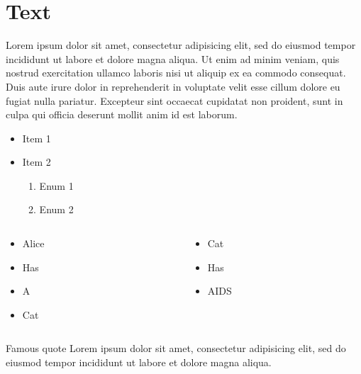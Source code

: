 {
\tableofcontents
}


\section{Text}


{
\begin{multicols}{2}
Lorem ipsum dolor sit amet, consectetur adipisicing elit, sed do eiusmod tempor incididunt ut labore et dolore magna aliqua. Ut enim ad minim veniam, quis nostrud exercitation ullamco laboris nisi ut aliquip ex ea commodo consequat. Duis aute irure dolor in reprehenderit in voluptate velit esse cillum dolore eu fugiat nulla pariatur. Excepteur sint occaecat cupidatat non proident, sunt in culpa qui officia deserunt mollit anim id est laborum.
\end{multicols}
}


{
\begin{itemize}
\item Item 1
\pause

\item Item 2
\begin{enumerate}
\item Enum 1
\item Enum 2
\end{enumerate}
\end{itemize}
}


{
\begin{columns}

\begin{column}{0.45\textwidth}
\begin{itemize}
\item Alice
\item Has
\item A
\item Cat
\end{itemize}
\end{column}

\begin{column}{0.45\textwidth}
\begin{itemize}
\item Cat
\item Has
\item AIDS
\end{itemize}
\end{column}

\end{columns}
}


{
\begin{block}{Famous quote}
Lorem ipsum dolor sit amet, consectetur adipisicing elit, sed do eiusmod tempor incididunt ut labore et dolore magna aliqua.
\end{block}
}


